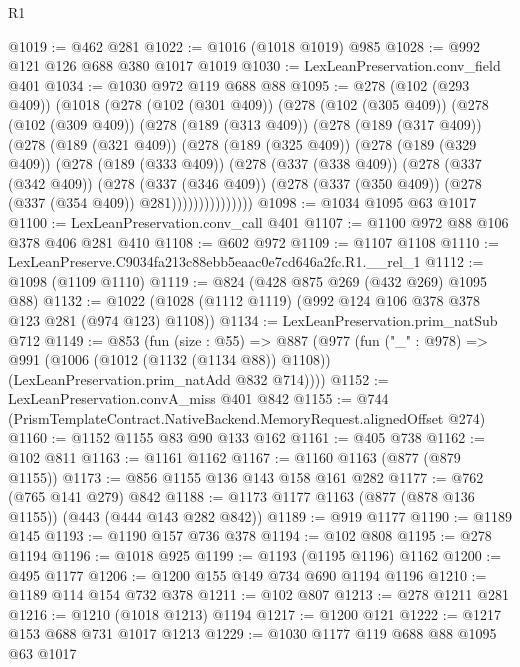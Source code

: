 \begin{lexlean}{R1}
\begin{coremodule}
@1019 := @462 @281
@1022 := @1016 (@1018 @1019) @985
@1028 := @992 @121 @126 @688 @380 @1017 @1019
@1030 := LexLeanPreservation.conv_field @401
@1034 := @1030 @972 @119 @688 @88
@1095 := @278
    (@102 (@293 @409))
    (@1018
      (@278
        (@102 (@301 @409))
        (@278
          (@102 (@305 @409))
          (@278
            (@102 (@309 @409))
            (@278
              (@189 (@313 @409))
              (@278
                (@189 (@317 @409))
                (@278
                  (@189 (@321 @409))
                  (@278
                    (@189 (@325 @409))
                    (@278
                      (@189 (@329 @409))
                      (@278
                        (@189 (@333 @409))
                        (@278
                          (@337 (@338 @409))
                          (@278
                            (@337 (@342 @409))
                            (@278
                              (@337 (@346 @409))
                              (@278 (@337 (@350 @409)) (@278 (@337 (@354 @409)) @281)))))))))))))))
@1098 := @1034 @1095 @63 @1017
@1100 := LexLeanPreservation.conv_call @401
@1107 := @1100 @972 @88 @106 @378 @406 @281 @410
@1108 := @602 @972
@1109 := @1107 @1108
@1110 := LexLeanPreserve.C9034fa213c88ebb5eaac0e7cd646a2fc.R1.__rel_1
@1112 := @1098 (@1109 @1110)
@1119 := @824 (@428 @875 @269 (@432 @269) @1095 @88)
@1132 := @1022 (@1028 (@1112 @1119) (@992 @124 @106 @378 @378 @123 @281 (@974 @123) @1108))
@1134 := LexLeanPreservation.prim_natSub @712
@1149 := @853
    (fun (size : @55) =>
    @887
      (@977
        (fun ("_" : @978) =>
        @991
          (@1006 (@1012 (@1132 (@1134 @88)) @1108))
          (LexLeanPreservation.prim_natAdd @832 @714))))
@1152 := LexLeanPreservation.convA_miss @401 @842
@1155 := @744 (PrismTemplateContract.NativeBackend.MemoryRequest.alignedOffset @274)
@1160 := @1152 @1155 @83 @90 @133 @162
@1161 := @405 @738
@1162 := @102 @811
@1163 := @1161 @1162
@1167 := @1160 @1163 (@877 (@879 @1155))
@1173 := @856 @1155 @136 @143 @158 @161 @282
@1177 := @762 (@765 @141 @279) @842
@1188 := @1173 @1177 @1163 (@877 (@878 @136 @1155)) (@443 (@444 @143 @282 @842))
@1189 := @919 @1177
@1190 := @1189 @145
@1193 := @1190 @157 @736 @378
@1194 := @102 @808
@1195 := @278 @1194
@1196 := @1018 @925
@1199 := @1193 (@1195 @1196) @1162
@1200 := @495 @1177
@1206 := @1200 @155 @149 @734 @690 @1194 @1196
@1210 := @1189 @114 @154 @732 @378
@1211 := @102 @807
@1213 := @278 @1211 @281
@1216 := @1210 (@1018 @1213) @1194
@1217 := @1200 @121
@1222 := @1217 @153 @688 @731 @1017 @1213
@1229 := @1030 @1177 @119 @688 @88 @1095 @63 @1017

\end{coremodule}
\end{lexlean}
